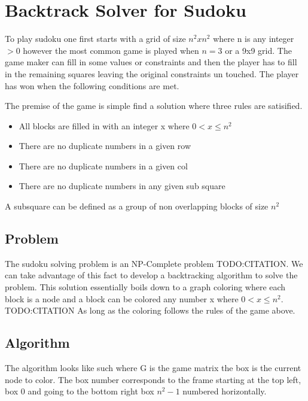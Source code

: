 \documentclass{sig-alternate}
\begin{document}
\section{Backtrack Solver for Sudoku}

To play sudoku one first starts with a grid of size $n^2 x n^2$ where n is any integer $> 0$ however the most common game is 
played when $n = 3$ or a 9x9 grid. The game maker can fill in some values or constraints and then the player has to fill in
the remaining squares leaving the original constraints un touched. The player has won when the following conditions are met.

The premise of the game is simple find a solution where three rules are satisified.
\begin{itemize}
\item{All blocks are filled in with an integer x where $0 < x \le n^2$}
\item{There are no duplicate numbers in a given row}
\item{There are no duplicate numbers in a given col}
\item{There are no duplicate numbers in any given sub square}
\end{itemize}
A subsquare can be defined as a group of non overlapping blocks of size $n^2$

\subsection{Problem}
The sudoku solving problem is an NP-Complete problem TODO:CITATION. We can take
advantage of this fact to develop a backtracking algorithm to solve the problem. This solution
essentially boils down to a graph coloring where each block is a node and a block can be colored any number x where $0 < x \le n^2$. TODO:CITATION
As long as the coloring follows the rules of the game above. 

\subsection{Algorithm}
The algorithm looks like such where G is the game matrix the box is the current node to color. The box number corresponds to the frame starting at the top left, box 0 and going to the bottom right box $n^2 - 1$ numbered horizontally.
\end{document}
